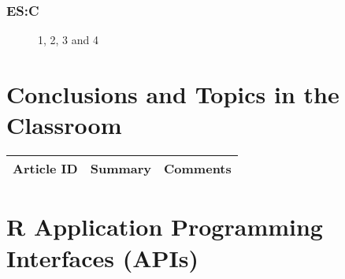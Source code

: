 \subsubsection{ES:C}

\begin{figure}[H]
	\centering
	\begin{minipage}[b]{0.5\linewidth}
	\end{minipage}\hfill
	\begin{minipage}[b]{0.5\linewidth}
	\end{minipage}\hfill	
	\begin{minipage}[b]{0.5\linewidth}
	\end{minipage}\hfill
	\begin{minipage}[b]{0.5\linewidth}
	\end{minipage}\hfill
	\caption{1, 2, 3 and 4}
	\label{fig:Figure1}
\end{figure} 


\section{Conclusions and Topics in the Classroom}

\begin{table}[H]\centering
	\begin{tabular}{p{1cm}p{4cm}p{3cm}}
		Article ID & Summary & Comments\\
		\hline
		\hline
	\end{tabular}
\end{table}


\section{R Application Programming Interfaces (APIs)}

